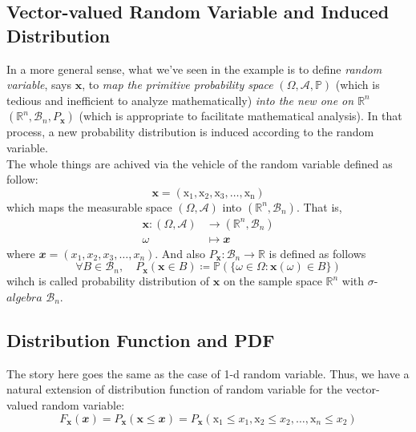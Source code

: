 \documentclass[twoside]{article}
\theoremstyle{definition}
\theoremstyle{remark}
\theoremstyle{remark}
\begin{document}
\subsection{Vector-valued Random Variable and Induced Distribution}
In a more general sense, what we've seen in the example is to define \textit{random
variable}, says $\mathbf{x}$, to \textit{map the primitive probability space} $(
\Omega, \mathcal{A}, \mathbb{P})$ (which is tedious and inefficient to analyze
mathematically) \textit{into the new one on $\mathbb{R}^n$} $(\mathbb{R}^n,
\mathcal{B}_n, P_\mathbf{x})$ (which is appropriate to facilitate mathematical
analysis). In that process, a new probability distribution is induced according
to the random variable. \\[0.5\baselineskip]
The whole things are achived via the vehicle of the random variable defined as
follow:
\begin{equation}
  \mathbf{x} = \mathrm{(x_1, x_2, x_3, \ldots, x_n)}
\end{equation}
which maps the measurable space $(\Omega, \mathcal{A})$ into $(\mathbb{R}^n,
\mathcal{B}_n)$. That is,
\begin{equation}
  \begin{split}
    \mathbf{x}: (\Omega, \mathcal{A}) & \rightarrow (\mathbb{R}^n, \mathcal{B}_n) \\
    \omega & \mapsto \mathbfit{x}
  \end{split}
\end{equation}
where $\mathbfit{x} = (x_1, x_2, x_3, \ldots, x_n)$. And also $P_\mathbf{x}:\mathcal{B}_n
\rightarrow \mathbb{R}$ is defined as follows
\begin{equation}
  \forall B \in \mathcal{B}_n,
  \quad P_\mathbf{x}(\mathbf{x} \in B)
  \coloneqq \mathbb{P}(\{\omega \in \Omega : \mathbf{x}(\omega) \in B\})
\end{equation}
wihch is called probability distribution of $\mathbf{x}$ on the sample space
$\mathbb{R}^n$ with $\sigma$-$algebra$ $\mathcal{B}_n$.

\subsection{Distribution Function and PDF}
The story here goes the same as the case of 1-d random variable. Thus, we have
a natural extension of distribution function of random variable for the vector-valued
random variable:
\begin{equation}
  F_\mathbf{x}(\mathbfit{x})
  = P_\mathbf{x}(\mathbf{x} \leq \mathbfit{x})
  = P_\mathbf{x}(\mathrm{x}_1 \leq x_1, \mathrm{x}_2 \leq x_2, \ldots, \mathrm{x}_n \leq x_2)
\end{equation}
\end{document}
